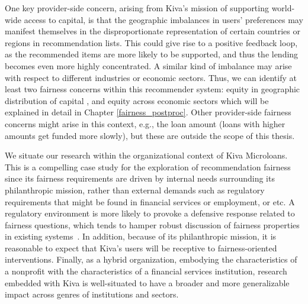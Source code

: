     One key provider-side concern, arising from Kiva's mission of supporting world-wide access to capital, is that the geographic imbalances in users' preferences may manifest themselves in the disproportionate representation of certain countries or regions in recommendation lists. This could give rise to a positive feedback loop, as the recommended items are more likely to be supported, and thus the lending becomes even more highly concentrated. A similar kind of imbalance may arise with respect to different industries or economic sectors. Thus, we can identify at least two fairness concerns within this recommender system: equity in geographic distribution of capital \cite{liu2019personalized}, and equity across economic sectors \cite{sonboli2020opportunistic} which will be explained in detail in Chapter \ref{fairness_postproc}. Other provider-side fairness concerns might arise in this context, e.g., the loan amount (loans with higher amounts get funded more slowly), but these are outside the scope of this thesis.
    
    We situate our research within the organizational context of Kiva Microloans. This is a compelling case study for the exploration of recommendation fairness since its fairness requirements are driven by internal needs surrounding its philanthropic mission, rather than external demands such as regulatory requirements that might be found in financial services or employment, or etc. A regulatory environment is more likely to provoke a defensive response related to fairness questions, which tends to hamper robust discussion of fairness properties in existing systems~\cite{chen2018fair,holstein2019improving}. In addition, because of its philanthropic mission, it is reasonable to expect that Kiva's users will be receptive to fairness-oriented interventions. Finally, as a hybrid organization, embodying the characteristics of a nonprofit with the characteristics of a financial services institution, research embedded with Kiva is well-situated to have a broader and more generalizable impact across genres of institutions and sectors.



